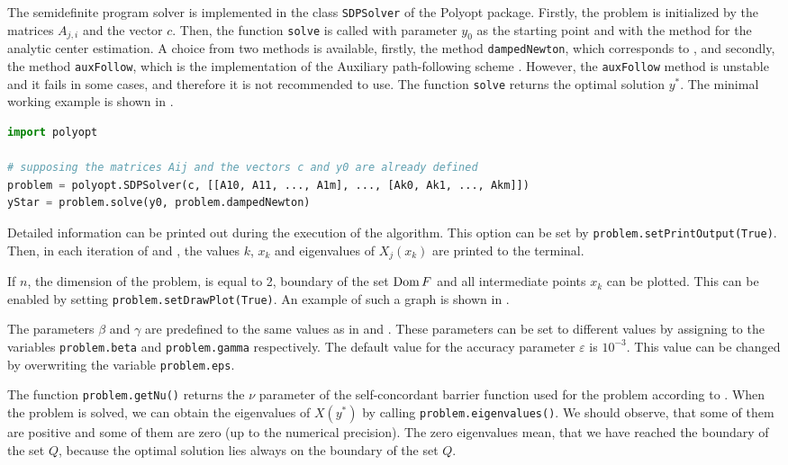 The semidefinite program solver is implemented in the class \texttt{SDPSolver} of the Polyopt package. Firstly, the problem is initialized by the matrices $A_{j,i}$ and the vector $c$.
Then, the function \texttt{solve} is called with parameter $y_0$ as the starting point and with the method for the analytic center estimation.
A choice from two methods is available, firstly, the method \texttt{dampedNewton}, which corresponds to , and secondly, the method \texttt{auxFollow}, which is the implementation of the Auxiliary path-following scheme \cite{Nesterov-2004}. 
However, the \texttt{auxFollow} method is unstable and it fails in some cases, and therefore it is not recommended to use.
The function \texttt{solve} returns the optimal solution $y^*$.
The minimal working example is shown in .
\begin{lstlisting}[language=python, caption={Typical usage of the class \texttt{SDPSolver} of the Polyopt package.}, labellis={SDP:imp:usage}]
import polyopt

# supposing the matrices Aij and the vectors c and y0 are already defined
problem = polyopt.SDPSolver(c, [[A10, A11, ..., A1m], ..., [Ak0, Ak1, ..., Akm]])
yStar = problem.solve(y0, problem.dampedNewton)
\end{lstlisting}

Detailed information can be printed out during the execution of the algorithm.
This option can be set by \texttt{problem.setPrintOutput(True)}.
Then, in each iteration of  and , the values $k$, $x_k$ and eigenvalues of $X_j(x_k)$ are printed to the terminal.

If $n$, the dimension of the problem, is equal to 2, boundary of the set $\operatorname{Dom} F$  and all intermediate points $x_k$ can be plotted.
This can be enabled by setting \texttt{problem.setDrawPlot(True)}.
An example of such a graph is shown in .

The parameters $\beta$ and $\gamma$ are predefined to the same values as in  and .
These parameters can be set to different values by assigning to the variables \texttt{problem.beta} and \texttt{problem.gamma} respectively.
The default value for the accuracy parameter $\varepsilon$ is $10^{-3}$.
This value can be changed by overwriting the variable \texttt{problem.eps}.

The function \texttt{problem.getNu()} returns the $\nu$ parameter of the self-concordant barrier function used for the problem according to .
When the problem is solved, we can obtain the eigenvalues of $X(y^*)$ by calling \texttt{problem.eigenvalues()}.
We should observe, that some of them are positive and some of them are zero (up to the numerical precision).
The zero eigenvalues mean, that we have reached the boundary of the set $Q$, because the optimal solution lies always on the boundary of the set $Q$.


